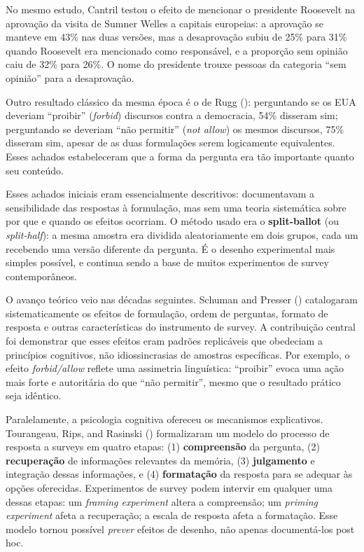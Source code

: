 \documentclass[
]{article}
\begin{document}
No mesmo estudo, Cantril testou o efeito de mencionar o presidente Roosevelt na aprovação da visita de Sumner Welles a capitais europeias: a aprovação se manteve em 43\% nas duas versões, mas a desaprovação subiu de 25\% para 31\% quando Roosevelt era mencionado como responsável, e a proporção sem opinião caiu de 32\% para 26\%. O nome do presidente trouxe pessoas da categoria ``sem opinião'' para a desaprovação.

Outro resultado clássico da mesma época é o de Rugg (): perguntando se os EUA deveriam ``proibir'' (\emph{forbid}) discursos contra a democracia, 54\% disseram sim; perguntando se deveriam ``não permitir'' (\emph{not allow}) os mesmos discursos, 75\% disseram sim, apesar de as duas formulações serem logicamente equivalentes. Esses achados estabeleceram que a forma da pergunta era tão importante quanto seu conteúdo.

Esses achados iniciais eram essencialmente descritivos: documentavam a sensibilidade das respostas à formulação, mas sem uma teoria sistemática sobre por que e quando os efeitos ocorriam. O método usado era o \textbf{split-ballot} (ou \emph{split-half}): a mesma amostra era dividida aleatoriamente em dois grupos, cada um recebendo uma versão diferente da pergunta. É o desenho experimental mais simples possível, e continua sendo a base de muitos experimentos de survey contemporâneos.

O avanço teórico veio nas décadas seguintes. Schuman and Presser () catalogaram sistematicamente os efeitos de formulação, ordem de perguntas, formato de resposta e outras características do instrumento de survey. A contribuição central foi demonstrar que esses efeitos eram padrões replicáveis que obedeciam a princípios cognitivos, não idiossincrasias de amostras específicas. Por exemplo, o efeito \emph{forbid/allow} reflete uma assimetria linguística: ``proibir'' evoca uma ação mais forte e autoritária do que ``não permitir'', mesmo que o resultado prático seja idêntico.

Paralelamente, a psicologia cognitiva ofereceu os mecanismos explicativos. Tourangeau, Rips, and Rasinski () formalizaram um modelo do processo de resposta a surveys em quatro etapas: (1) \textbf{compreensão} da pergunta, (2) \textbf{recuperação} de informações relevantes da memória, (3) \textbf{julgamento} e integração dessas informações, e (4) \textbf{formatação} da resposta para se adequar às opções oferecidas. Experimentos de survey podem intervir em qualquer uma dessas etapas: um \emph{framing experiment} altera a compreensão; um \emph{priming experiment} afeta a recuperação; a escala de resposta afeta a formatação. Esse modelo tornou possível \emph{prever} efeitos de desenho, não apenas documentá-los post hoc.
\end{document}
